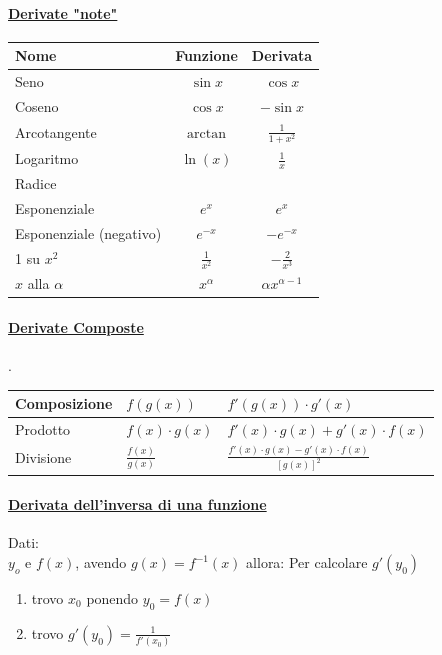 \documentclass[12pt, a4paper]{article}
\begin{document}
\paragraph*{\underline{Derivate "note"}}
\begin{tabularx}{0.775\textwidth}{|Y|c|c|}
	\hline
	\textbf{Nome}           & \textbf{Funzione} & \textbf{Derivata}     \\
	\hline
	\hline
	Seno                    & $\sin x$          & $\cos x$              \\
	\hline
	Coseno                  & $\cos x$          & $-\sin x$             \\
	\hline
	Arcotangente            & $\arctan$         & $\frac{1}{1+x^2}$     \\
	\hline
	Logaritmo               & $\ln(x) $         & $\frac{1}{x}$         \\
	\hline
	Radice                  &                   &                       \\
	\hline
	Esponenziale            & $e^x$             & $e^x$                 \\
	\hline
	Esponenziale (negativo) & $e^{-x}$          & $ -e^{-x}$            \\
	 su $x^2$              & $\frac{1}{x^2}$   & $-\frac{2}{x^3}$      \\
	\hline
	$x$ alla $\alpha$       & $x^\alpha$        & $\alpha x^{\alpha-1}$ \\
	\hline
\end{tabularx}

\paragraph*{\underline{Derivate Composte}}.\\

\begin{tabularx}{\textwidth}{|l|Y|Y|}
	\hline
	Composizione & $f(g(x))$           & $ f'(g(x))\cdot g'(x)$                                \\
	\hline
	Prodotto     & $f(x)\cdot g(x)$    & $f'(x)\cdot g(x) + g'(x)\cdot f(x)$                   \\
	\hline
	Divisione    & $\frac{f(x)}{g(x)}$ & $\frac{f'(x)\cdot g(x) - g'(x) \cdot f(x)}{[g(x)]^2}$ \\
	\hline
\end{tabularx}

\paragraph*{\underline{Derivata dell'inversa di una funzione}}
Dati:\\
$y_o$ e $f(x)$, avendo $g(x) = f^{-1}(x)$ allora:
Per calcolare $g'(y_0)$
\begin{enumerate}
	\item trovo $x_0$ ponendo $y_0=f(x)$
	\item trovo $g'(y_0)=\frac{1}{f'(x_0)}$
\end{enumerate}
\end{document}
